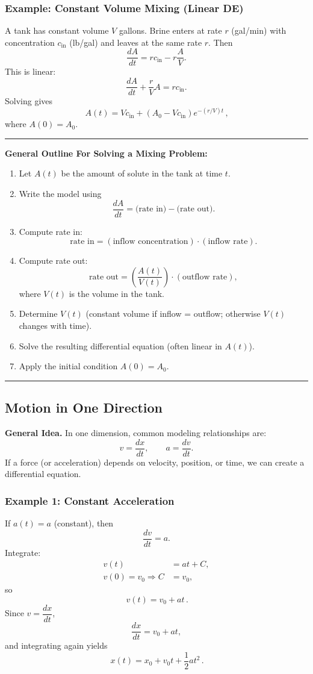 \documentclass[11pt]{article}
\begin{document}
\subsubsection*{Example: Constant Volume Mixing (Linear DE)}
A tank has constant volume $V$ gallons. Brine enters at rate $r$ (gal/min) with concentration $c_{\text{in}}$ (lb/gal) and leaves at the same rate $r$.
Then
\[
\frac{dA}{dt}=rc_{\text{in}}-r\frac{A}{V}.
\]
This is linear:
\[
\frac{dA}{dt}+\frac{r}{V}A=rc_{\text{in}}.
\]
Solving gives
\[
\boxed{\,A(t)=Vc_{\text{in}}+\left(A_0-Vc_{\text{in}}\right)e^{-(r/V)t}\,},
\]
where $A(0)=A_0$.

\noindent\rule{\linewidth}{0.4pt}
\textbf{General Outline For Solving a Mixing Problem:}
\begin{enumerate}[topsep=2pt, itemsep=2pt, leftmargin=*]
    \item Let $A(t)$ be the amount of solute in the tank at time $t$.
    \item Write the model using
    \[
    \frac{dA}{dt}=\text{(rate in)}-\text{(rate out)}.
    \]
    \item Compute rate in:
    \[
    \text{rate in}=(\text{inflow concentration})\cdot(\text{inflow rate}).
    \]
    \item Compute rate out:
    \[
    \text{rate out}=\left(\frac{A(t)}{V(t)}\right)\cdot(\text{outflow rate}),
    \]
    where $V(t)$ is the volume in the tank.
    \item Determine $V(t)$ (constant volume if inflow = outflow; otherwise $V(t)$ changes with time).
    \item Solve the resulting differential equation (often linear in $A(t)$).
    \item Apply the initial condition $A(0)=A_0$.
\end{enumerate}
\noindent\rule{\linewidth}{0.4pt}

\subsection{Motion in One Direction}

\noindent \textbf{General Idea.}
In one dimension, common modeling relationships are:
\[
v=\frac{dx}{dt},
\qquad
a=\frac{dv}{dt}.
\]
If a force (or acceleration) depends on velocity, position, or time, we can create a differential equation.

\subsubsection*{Example 1: Constant Acceleration}
If $a(t)=a$ (constant), then
\[
\frac{dv}{dt}=a.
\]
Integrate:
\begin{align*}
v(t) &= at + C,\\
v(0)=v_0 \Rightarrow C&=v_0,
\end{align*}
so
\[
\boxed{\,v(t)=v_0+at\,}.
\]
Since $v=\dfrac{dx}{dt}$,
\[
\frac{dx}{dt}=v_0+at,
\]
and integrating again yields
\[
\boxed{\,x(t)=x_0+v_0t+\frac{1}{2}at^2\,}.
\]
\end{document}
